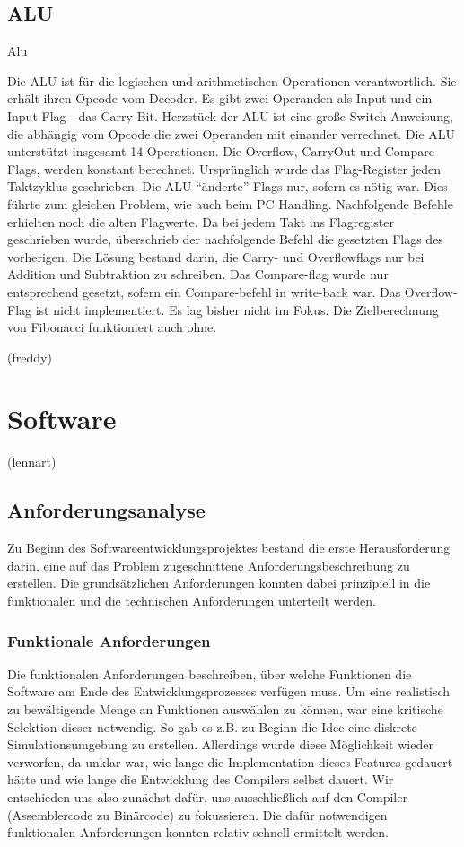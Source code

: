 \documentclass[paper=a4,fontsize=12pt,twocolumn]{scrreprt}
\begin{document}
\section{ALU}

Alu

Die ALU ist für die logischen und arithmetischen Operationen verantwortlich.
Sie erhält ihren Opcode vom Decoder.
Es gibt zwei Operanden als Input und ein Input Flag - das Carry Bit.
Herzstück der ALU ist eine große Switch Anweisung, die abhängig vom Opcode die zwei Operanden mit einander verrechnet.
Die ALU unterstützt insgesamt 14 Operationen. 
Die Overflow, CarryOut und Compare Flags, werden konstant berechnet.
Ursprünglich wurde das Flag-Register jeden Taktzyklus geschrieben.
Die ALU \enquote{änderte} Flags nur, sofern es nötig war.
Dies führte zum gleichen Problem, wie auch beim PC Handling.
Nachfolgende Befehle erhielten noch die alten Flagwerte.
Da bei jedem Takt ins Flagregister geschrieben wurde, überschrieb der nachfolgende Befehl die gesetzten Flags des vorherigen.
Die Lösung bestand darin, die Carry- und Overflowflags nur bei Addition und Subtraktion zu schreiben.
Das Compare-flag wurde nur entsprechend gesetzt, sofern ein Compare-befehl in write-back war.
Das Overflow-Flag ist nicht implementiert.
Es lag bisher nicht im Fokus.
Die Zielberechnung von Fibonacci funktioniert auch ohne.



(freddy)

\chapter{Software}

(lennart)

\section{Anforderungsanalyse}
Zu Beginn des Softwareentwicklungsprojektes bestand die erste Herausforderung darin, eine auf das Problem zugeschnittene Anforderungsbeschreibung zu erstellen.
Die grundsätzlichen Anforderungen konnten dabei prinzipiell in die funktionalen und die technischen Anforderungen unterteilt werden. 

\subsection{Funktionale Anforderungen}
Die funktionalen Anforderungen beschreiben, über welche Funktionen die Software am Ende des Entwicklungsprozesses verfügen muss.
Um eine realistisch zu bewältigende Menge an Funktionen auswählen zu können, war eine  kritische Selektion dieser notwendig. 
So gab es z.B. zu Beginn die Idee eine diskrete Simulationsumgebung zu erstellen. Allerdings wurde diese Möglichkeit wieder verworfen, da unklar war, wie lange die Implementation dieses Features gedauert hätte und wie lange die Entwicklung des Compilers selbst dauert.
Wir entschieden uns also zunächst dafür, uns ausschließlich auf den Compiler (Assemblercode zu Binärcode) zu fokussieren.
Die dafür notwendigen funktionalen Anforderungen konnten relativ schnell ermittelt werden.
\end{document}
